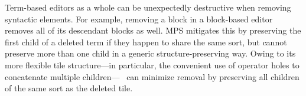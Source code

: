 Term-based editors as a whole can be unexpectedly
destructive when removing syntactic elements.
For example, removing a block in a block-based editor
removes all of its descendant blocks as well.
MPS mitigates this by preserving the first child of a deleted term
if they happen to share the same sort,
but cannot preserve more than one child in a generic
structure-preserving way.
Owing to its more flexible tile structure---in particular,
the convenient use of operator holes to concatenate
multiple children---\tylr~ can minimize removal
by preserving all children of the
same sort as the deleted tile.






